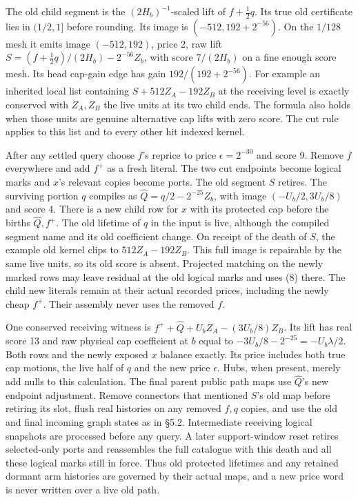 \documentclass[11pt]{article}
\begin{document}
The old child segment is the \((2H_b)^{-1}\)-scaled lift of \(f+\tfrac12 q\). Its true old certificate lies in \((1/2,1]\) before rounding. Its image is \((-512,192+2^{-56})\). On the \(1/128\) mesh it emits image \((-512,192)\), price 2, raw lift \(S=(f+\tfrac12 q)/(2H_b)-2^{-56}Z_b\), with score \(7/(2H_b)\) on a fine enough score mesh. Its head cap-gain edge has gain \(192/(192+2^{-56})\). For example an inherited local list containing \(S+512 Z_A-192 Z_B\) at the receiving level is exactly conserved with \(Z_A,Z_B\) the live units at its two child ends. The formula also holds when those units are genuine alternative cap lifts with zero score. The cut rule applies to this list and to every other hit indexed kernel.

After any settled query choose \(f\)'s reprice to price \(\epsilon=2^{-30}\) and score 9. Remove \(f\) everywhere and add \(f^+\) as a fresh literal. The two cut endpoints become logical marks and \(x\)'s relevant copies become ports. The old segment \(S\) retires. The surviving portion \(q\) compiles as \(\widehat Q= q/2-2^{-25}Z_b\), with image \((-U_b/2,3U_b/8)\) and score 4. There is a new child row for \(x\) with its protected cap before the births \(\widehat Q,f^+\). The old lifetime of \(q\) in the input is live, although the compiled segment name and its old coefficient change. On receipt of the death of \(S\), the example old kernel clips to \(512Z_A-192Z_B\). This full image is repairable by the same live units, so its old score is absent. Projected matching on the newly marked rows may leave residual at the old logical marks and uses (8) there. The child new literals remain at their actual recorded prices, including the newly cheap \(f^+\). Their assembly never uses the removed \(f\).

One conserved receiving witness is \(f^++\widehat Q+U_b Z_A-(3U_b/8) Z_B\). Its lift has real score 13 and raw physical cap coefficient at \(b\) equal to \(-3U_b/8-2^{-25}=-U_b\lambda/2\). Both rows and the newly exposed \(x\) balance exactly. Its price includes both true cap motions, the live half of \(q\) and the new price \(\epsilon\). Hubs, when present, merely add nulls to this calculation. The final parent public path maps use \(\widehat Q\)'s new endpoint adjustment. Remove connectors that mentioned \(S\)'s old map before retiring its slot, flush real histories on any removed \(f,q\) copies, and use the old and final incoming graph states as in §5.2. Intermediate receiving logical snapshots are processed before any query. A later support-window reset retires selected-only ports and reassembles the full catalogue with this death and all these logical marks still in force. Thus old protected lifetimes and any retained dormant arm histories are governed by their actual maps, and a new price word is never written over a live old path.
\end{document}
